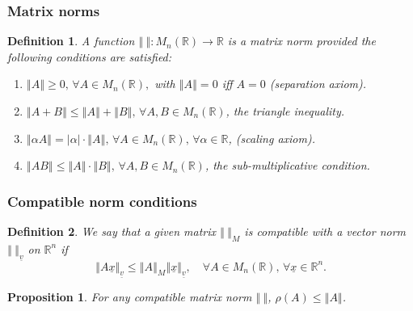 \documentclass{article}
\newtheorem{definition}{Definition}
\newtheorem{proposition}{Proposition}
\begin{document}
\subsubsection{Matrix norms}
\begin{definition}
    A function $\left\Vert \ \right\Vert:M_n(\mathbb{R})\to\mathbb{R}$ is a matrix norm provided the following conditions are satisfied:
    \begin{enumerate}
        \item $\left\Vert A \right\Vert\geq0,\,\forall A\in M_n(\mathbb{R}),$ with $\left\Vert A \right\Vert=0$ iff $A=0$ (separation axiom).
        \item $\left\Vert A+B \right\Vert\leq\left\Vert A \right\Vert+\left\Vert B \right\Vert,\,\forall A,B\in M_n(\mathbb{R})$, the triangle inequality.
        \item $\left\Vert \alpha A \right\Vert = \vert\alpha\vert \cdot \left\Vert A \right\Vert,\,\forall A\in M_n(\mathbb{R}),\,\forall\alpha\in\mathbb{R}$, (scaling axiom).
        \item $\left\Vert AB \right\Vert\leq\left\Vert A \right\Vert\cdot\left\Vert B \right\Vert,\,\forall A,B\in M_n(\mathbb{R})$, the sub-multiplicative condition.
    \end{enumerate}
\end{definition}
\subsubsection{Compatible norm conditions}
\begin{definition}
    We say that a given matrix $\left\Vert \ \right\Vert_M$ is compatible with a vector norm $\left\Vert \ \right\Vert_{\underline{v}}$ on $\mathbb{R}^n$ if
    \begin{equation}
        \left\Vert A\underline{x} \right\Vert_{\underline{v}} \leq \left\Vert A \right\Vert_{M}\left\Vert \underline{x} \right\Vert_{\underline{v}},\quad \forall A\in M_n(\mathbb{R}),\,\forall\underline{x}\in\mathbb{R}^n.\nonumber
    \end{equation}
\end{definition}
\begin{proposition}
    For any compatible matrix norm $\left\Vert \ \right\Vert$, $\rho(A)\leq\left\Vert A \right\Vert$.
\end{proposition}
\end{document}
